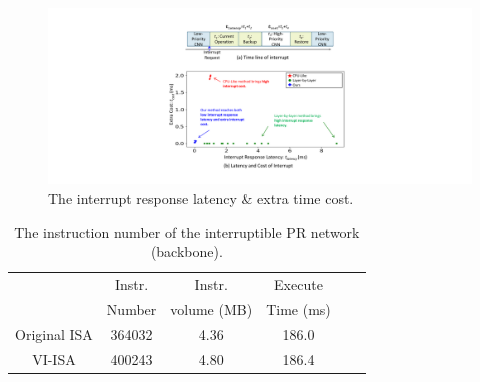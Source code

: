 \begin{figure}[t]
  \centering
  \setlength{\abovecaptionskip}{0cm} 
  \includegraphics[width=0.99\linewidth]{fig/PRresult.pdf}
  \caption{The interrupt response latency \& extra time cost.}
  \label{fig:scatter1024}
\end{figure}
\begin{table}[t]
  \small
  \centering
  \setlength{\abovecaptionskip}{2pt}
  \caption{The instruction number of the interruptible PR network (backbone). }
\begin{tabular}{|c|c|c|c|c|c|}
  \hline
         & Instr.  & Instr. & Execute \\
        & Number   & volume (MB) & Time (ms) \\
  \hline
  Original ISA   &      364032      & 4.36 & 186.0 \\
  \hline
  VI-ISA   &     400243    & 4.80 & 186.4 \\
  \hline
  \end{tabular}%
  \label{tab:instrnum}%
\end{table}%



